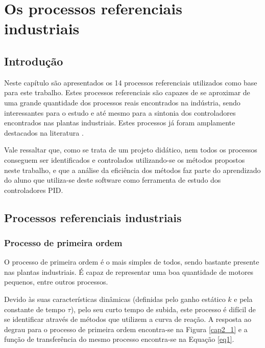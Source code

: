 \chapter{Os processos referenciais industriais
    \label{cap:processos-referenciais}}

\section{Introdução}

Neste capítulo são apresentados os 14 processos referenciais utilizados
como base para este trabalho. Estes processos referenciais são capazes de se
aproximar de uma grande quantidade dos processos reais encontrados na indústria,
sendo interessantes para o estudo e até mesmo para a sintonia dos controladores
encontrados nas plantas industriais. Estes processos já foram amplamente destacados
na literatura \cite{Isermann:1981:DCS:539455} \cite{ast+hagg100}.

Vale ressaltar que, como se trata de um projeto didático, nem todos os processos
conseguem ser identificados e controlados utilizando-se os métodos propostos
neste trabalho, e que a análise da eficiência dos métodos faz parte do aprendizado
do aluno que utiliza-se deste software como ferramenta de estudo dos controladores
\acs{PID}.

\section{Processos referenciais industriais}

\subsection{Processo de primeira ordem}
    
    O processo de primeira ordem é o mais simples de todos, sendo bastante presente
    nas plantas industriais. É capaz de representar uma boa quantidade de motores
    pequenos, entre outros processos.
    
    Devido às suas características dinâmicas (definidas pelo ganho estático $k$ e
    pela constante de tempo $\tau$), pelo seu curto tempo de subida, este processo
    é difícil de se identificar através de métodos que utilizem a curva de reação.
    A resposta ao degrau para o processo de primeira ordem encontra-se na Figura
    \ref{cap2_1} e a função de transferência do mesmo processo encontra-se na
    Equação \ref{eq1}.
    
